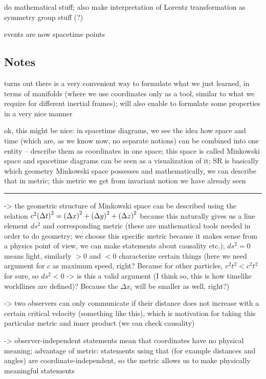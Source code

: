 do mathematical stuff; also make interpretation of Lorentz transformation as symmetry group stuff (?)

events are now spacetime points




		\subsection{Notes}

turns out there is a very convenient way to formulate what we just learned, in terms of manifolds (where we use coordinates only as a tool, similar to what we require for different inertial frames); will also enable to formulate some properties in a very nice manner

ok, this might be nice: in spacetime diagrams, we see the idea how space and time (which are, as we know now, no separate notions) can be combined into one entity -- describe them as coordinates in one space; this space is called Minkowski space and spacetime diagrams can be seen as a visualization of it; SR is basically which geometry Minkowski space possesses and mathematically, we can describe that in metric; this metric we get from invariant notion we have already seen

\hrule

-> the geometric structure of Minkowski space can be described using the relation $c^2 \qty(\Delta t)^2 = \qty(\Delta x)^2 + \qty(\Delta y)^2 + \qty(\Delta z)^2$ because this naturally gives us a line element $ds^2$ and corresponding metric (these are mathematical tools needed in order to do geometry; we choose this specific metric because it makes sense from a physics point of view, we can make statements about causality etc.); $ds^2 = 0$ means light, similarly $> 0$ and $< 0$ characterize certain things (here we need argument for $c$ as maximum speed, right? Because for other particles, $v^2 t^2 < c^2 t^2$ for sure, so $ds^2 < 0$ -> is this a valid argument (I think so, this is how timelike worldlines are defined)? Because the $\Delta x_i$ will be smaller as well, right?)

-> two observers can only communicate if their distance does not increase with a certain critical velocity (something like this), which is motivation for taking this particular metric and inner product (we can check causality)

-> observer-independent statements mean that coordinates have no physical meaning; advantage of metric: statements using that (for example distances and angles) are coordinate-independent, so the metric allows us to make physically meaningful statements

